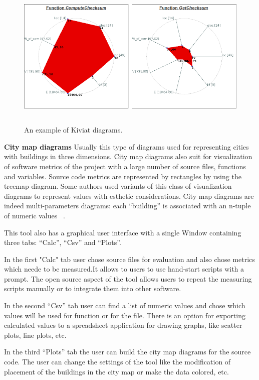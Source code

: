 \begin{figure}[ht]
	\centering
	\includegraphics[height=70mm]{figures/metrix.png}
	\caption{An example of Kiviat diagrams.}
	\label{fig:metrix}
\end{figure}

\textbf{City map diagrams}
Usually this type of diagrams used for representing cities with buildings in three dimensions. City map diagrams also suit for visualization of software metrics of the project with a large number of source files, functions and variables. Source code metrics are represented by rectangles by using the treemap diagram. Some authors used variants of this class of visualization diagrams to represent  values with esthetic considerations. City map diagrams are indeed multi-parameters diagrams: each “building” is associated with an n-tuple of numeric values ~\cite{metrix}.  

This tool also has a graphical user interface with a single Window containing three tabs: “Calc”, “Csv” and “Plots”.

In the first "Calc" tab user chose source files for evaluation and also chose metrics which neede to be measured.It allows to users to use  hand-start scripts with a prompt. The open source aspect of the tool allows users to repeat the measuring scripts manually or to integrate them into other software.

In the second “Csv” tab user can find a list of numeric values and chose which values will be used for function or for the file. There is an option for exporting calculated values to a spreadsheet application for drawing graphs, like scatter plots, line plots, etc.

In the third “Plots” tab the user can build the city map diagrams for the source code. The user can change the settings of the tool like the modification of placement of the buildings in the city map or make the data colored, etc.

